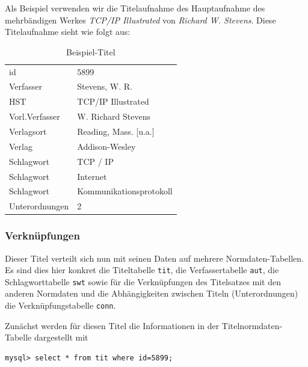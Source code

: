 \documentclass[11pt, twoside, a4paper, BCOR8mm, DIV12, bibtotoc,idxtotoc]{scrbook}
\begin{document}
Als Beispiel verwenden wir die Titelaufnahme des Hauptaufnahme des
mehrbändigen Werkes \emph{TCP/IP Illustrated} von \emph{Richard W.
  Stevens}. Diese Titelaufnahme sieht wie folgt aus:

\begin{table}
  \begin{shadowenv}
    \vspace{3mm}
    \begin{center}
      \begin{tabular}{ll}
        id	        & 5899\\
        Verfasser	& Stevens, W. R.\\
        HST	        & TCP/IP Illustrated\\
        Vorl.Verfasser	& W. Richard Stevens\\
        Verlagsort	& Reading, Mass. [u.a.]\\
        Verlag	        & Addison-Wesley\\
        Schlagwort	& TCP / IP\\
        Schlagwort	& Internet\\
        Schlagwort	& Kommunikationsprotokoll\\
        Unterordnungen	& 2\\
      \end{tabular}
    \end{center}
    \caption{Beispiel-Titel\label{beispieltitel}}
    \vspace{3mm}
  \end{shadowenv}
\end{table}

\subsubsection{Verknüpfungen}
Dieser Titel verteilt sich nun mit seinen Daten auf mehrere
Normdaten-Tabellen. Es sind dies hier konkret die Titeltabelle
\texttt{tit}, die Verfassertabelle \texttt{aut}, die Schlagworttabelle
\texttt{swt} sowie für die Verknüpfungen des Titelsatzes mit den
anderen Normdaten und die Abhängigkeiten zwischen Titeln
(Unterordnungen) die Verknüpfungstabelle \texttt{conn}.

Zunächst werden für diesen Titel die Informationen in der
Titelnormdaten-Tabelle dargestellt mit 

\begin{verbatim}
mysql> select * from tit where id=5899;
\end{verbatim}
\end{document}
